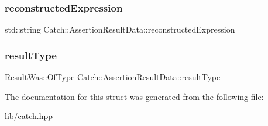 \subsubsection{\texorpdfstring{reconstructed\+Expression}{reconstructedExpression}}
{\footnotesize\ttfamily std\+::string Catch\+::\+Assertion\+Result\+Data\+::reconstructed\+Expression}

\hypertarget{struct_catch_1_1_assertion_result_data_a7ceab4a7ff722aec5587e3748caf66b7}{}\label{struct_catch_1_1_assertion_result_data_a7ceab4a7ff722aec5587e3748caf66b7} 
\subsubsection{\texorpdfstring{result\+Type}{resultType}}
{\footnotesize\ttfamily \hyperlink{struct_catch_1_1_result_was_a624e1ee3661fcf6094ceef1f654601ef}{Result\+Was\+::\+Of\+Type} Catch\+::\+Assertion\+Result\+Data\+::result\+Type}



The documentation for this struct was generated from the following file\+:\begin{DoxyCompactItemize}
\item 
lib/\hyperlink{catch_8hpp}{catch.\+hpp}\end{DoxyCompactItemize}
